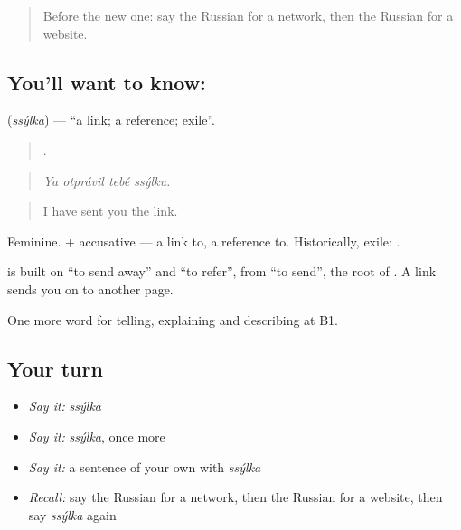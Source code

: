 \label{lesson:RU-C399-ssylka}



\begin{quote}
Before the new one: say the Russian for a network, then the Russian for a website.
\end{quote}

\subsection*{You'll want to know: }
\textbf{} (\emph{ssýlka}) — \textquotedblleft{}a link; a reference; exile\textquotedblright{}.

\begin{quote}
   .
\end{quote}

\begin{quote}
\emph{Ya otprávil tebé ssýlku.}
\end{quote}

\begin{quote}
I have sent you the link.
\end{quote}

Feminine. \emph{ } + accusative — a link to, a reference to. Historically, exile: \emph{  }.

\begin{cousinweb}
\textbf{} is built on \emph{} \textquotedblleft{}to send away\textquotedblright{} and \emph{} \textquotedblleft{}to refer\textquotedblright{}, from \emph{} \textquotedblleft{}to send\textquotedblright{}, the root of \emph{}. A link sends you on to another page.
\end{cousinweb}

\begin{grammarlens}[title={What you've built}]
One more word for telling, explaining and describing at B1.
\end{grammarlens}

\subsection*{Your turn}
\begin{itemize}
\raggedright
  \item \emph{Say it:} \emph{ssýlka}
  \item \emph{Say it:} \emph{ssýlka}, once more
  \item \emph{Say it:} a sentence of your own with \emph{ssýlka}
  \item \emph{Recall:} say the Russian for a network, then the Russian for a website, then say \emph{ssýlka} again
\end{itemize}


